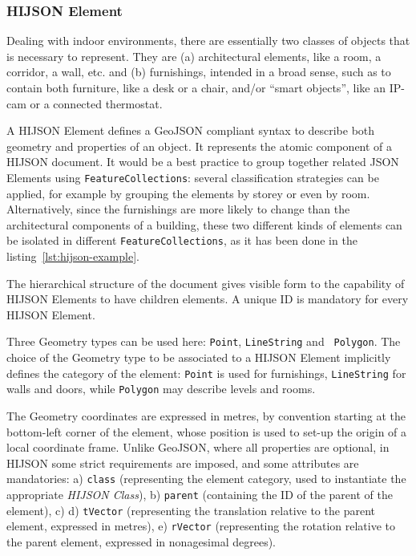 \subsubsection{HIJSON Element}

Dealing with indoor environments, there are essentially two classes of objects
that is necessary to represent. They are (a) architectural elements, like a
room, a corridor, a wall, etc. and (b) furnishings, intended in a broad sense,
such as to contain both furniture, like a desk or a chair, and/or ``smart objects'',
like an IP-cam or a connected thermostat.

A HIJSON Element defines a GeoJSON compliant syntax to describe both geometry and properties of
an object. It represents the atomic component of a HIJSON document. 
It would be a best practice to group
together related JSON Elements using \texttt{FeatureCollections}: several classification strategies
can be applied, for example by grouping the elements by storey or even by room.
Alternatively, since the furnishings are more likely to change than the
architectural components of a building, these two different kinds of elements
can be isolated in different \texttt{FeatureCollections}, as it has been done in the listing~\ref{lst:hijson-example}.

The hierarchical structure of the document gives visible form to the capability of HIJSON Elements to have children elements. A unique ID is mandatory for every HIJSON Element. 

Three Geometry types can be used here: \texttt{Point}, \texttt{LineString}  and {\tt
Polygon}. The choice of the Geometry type to be associated to a HIJSON Element
implicitly defines the category of the element: \texttt{Point} is used for
furnishings, \texttt{LineString} for walls and doors, while \texttt{Polygon} may
describe levels and rooms.

The Geometry coordinates are expressed in metres, by convention starting at
the bottom-left corner of the element, whose position is used to set-up the
origin of a local coordinate frame. Unlike GeoJSON, where all properties are
optional, in HIJSON some strict requirements are imposed, and some attributes
are mandatories: a) \texttt{class} (representing the element category, used to
instantiate  the appropriate \emph{HIJSON Class}), b) \texttt{parent}
(containing the ID of the parent of the element), c) d) \texttt{tVector}
(representing the translation relative to   the parent element, expressed in
metres), e) \texttt{rVector} (representing the rotation relative to   the
parent element, expressed in nonagesimal degrees).

